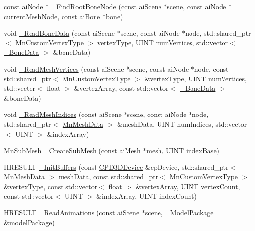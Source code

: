 \begin{DoxyCompactItemize}
\item 
const ai\+Node $\ast$ \hyperlink{class_m_n_l_1_1_mn_resource_pool_a6a7c7480baadf0f51a31eeb63cdee5cb}{\+\_\+\+Find\+Root\+Bone\+Node} (const ai\+Scene $\ast$scene, const ai\+Node $\ast$current\+Mesh\+Node, const ai\+Bone $\ast$bone)
\item 
void \hyperlink{class_m_n_l_1_1_mn_resource_pool_ad6968623dc167446598475230b369515}{\+\_\+\+Read\+Bone\+Data} (const ai\+Scene $\ast$scene, const ai\+Node $\ast$node, std\+::shared\+\_\+ptr$<$ \hyperlink{class_m_n_l_1_1_mn_custom_vertex_type}{Mn\+Custom\+Vertex\+Type} $>$ vertex\+Type, U\+I\+NT num\+Vertices, std\+::vector$<$ \hyperlink{struct_m_n_l_1_1_mn_resource_pool_1_1___bone_data}{\+\_\+\+Bone\+Data} $>$ \&bone\+Data)
\item 
void \hyperlink{class_m_n_l_1_1_mn_resource_pool_a27987643db1cb3f0af6f912fb5d67404}{\+\_\+\+Read\+Mesh\+Vertices} (const ai\+Scene $\ast$scene, const ai\+Node $\ast$node, const std\+::shared\+\_\+ptr$<$ \hyperlink{class_m_n_l_1_1_mn_custom_vertex_type}{Mn\+Custom\+Vertex\+Type} $>$ \&vertex\+Type, U\+I\+NT num\+Vertices, std\+::vector$<$ float $>$ \&vertex\+Array, const std\+::vector$<$ \hyperlink{struct_m_n_l_1_1_mn_resource_pool_1_1___bone_data}{\+\_\+\+Bone\+Data} $>$ \&bone\+Data)
\item 
void \hyperlink{class_m_n_l_1_1_mn_resource_pool_ace158d455ad6830d0aaf82994237dbda}{\+\_\+\+Read\+Mesh\+Indices} (const ai\+Scene $\ast$scene, const ai\+Node $\ast$node, std\+::shared\+\_\+ptr$<$ \hyperlink{class_m_n_l_1_1_mn_mesh_data}{Mn\+Mesh\+Data} $>$ \&mesh\+Data, U\+I\+NT num\+Indices, std\+::vector$<$ U\+I\+NT $>$ \&index\+Array)
\item 
\hyperlink{struct_m_n_l_1_1_mn_sub_mesh}{Mn\+Sub\+Mesh} \hyperlink{class_m_n_l_1_1_mn_resource_pool_a79fe0a932e8037c18e000541359fa1e6}{\+\_\+\+Create\+Sub\+Mesh} (const ai\+Mesh $\ast$mesh, U\+I\+NT index\+Base)
\item 
H\+R\+E\+S\+U\+LT \hyperlink{class_m_n_l_1_1_mn_resource_pool_a375d2b45a3a97f32df930f88a7afe170}{\+\_\+\+Init\+Buffers} (const \hyperlink{namespace_m_n_l_a1eec210db8f309a4a9ac0d9658784c31}{C\+P\+D3\+D\+Device} \&cp\+Device, std\+::shared\+\_\+ptr$<$ \hyperlink{class_m_n_l_1_1_mn_mesh_data}{Mn\+Mesh\+Data} $>$ mesh\+Data, const std\+::shared\+\_\+ptr$<$ \hyperlink{class_m_n_l_1_1_mn_custom_vertex_type}{Mn\+Custom\+Vertex\+Type} $>$ \&vertex\+Type, const std\+::vector$<$ float $>$ \&vertex\+Array, U\+I\+NT vertex\+Count, const std\+::vector$<$ U\+I\+NT $>$ \&index\+Array, U\+I\+NT index\+Count)
\item 
H\+R\+E\+S\+U\+LT \hyperlink{class_m_n_l_1_1_mn_resource_pool_a730bf312676520ba6b57f6d4a6dfdd6f}{\+\_\+\+Read\+Animations} (const ai\+Scene $\ast$scene, \hyperlink{struct_m_n_l_1_1_mn_resource_pool_1_1___model_package}{\+\_\+\+Model\+Package} \&model\+Package)
\end{DoxyCompactItemize}

